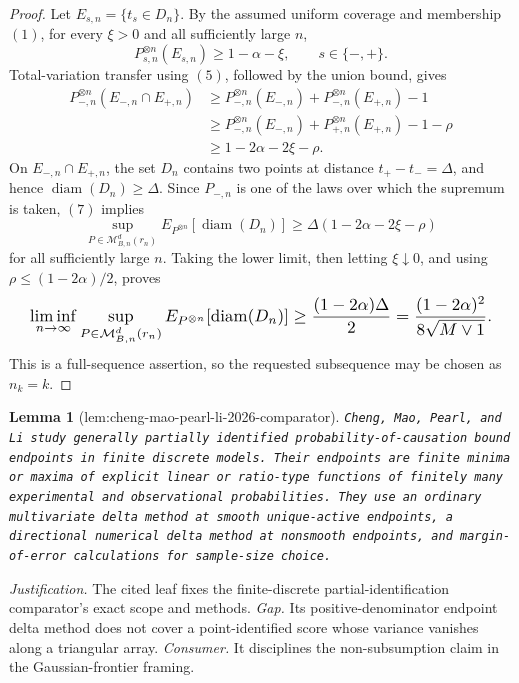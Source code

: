 \documentclass{article}
\newtheorem{lemma}{Lemma}
\begin{document}
\begin{proof}
Let \(E_{s,n}=\{t_s\in D_n\}\). By the assumed uniform coverage and membership \((1)\), for every \(\xi>0\) and all sufficiently large \(n\),
\[P_{s,n}^{\otimes n}(E_{s,n})\ge1-\alpha-\xi,\qquad s\in\{-,+\}.\tag{6}\]
Total-variation transfer using \((5)\), followed by the union bound, gives
\[\begin{aligned}
P_{-,n}^{\otimes n}(E_{-,n}\cap E_{+,n})
&\ge P_{-,n}^{\otimes n}(E_{-,n})+P_{-,n}^{\otimes n}(E_{+,n})-1\\
&\ge P_{-,n}^{\otimes n}(E_{-,n})+P_{+,n}^{\otimes n}(E_{+,n})-1-\rho\\
&\ge1-2\alpha-2\xi-\rho.
\end{aligned}\tag{7}\]
On \(E_{-,n}\cap E_{+,n}\), the set \(D_n\) contains two points at distance \(t_+-t_-=\Delta\), and hence \(\operatorname{diam}(D_n)\ge\Delta\). Since \(P_{-,n}\) is one of the laws over which the supremum is taken, \((7)\) implies
\[\sup_{P\in\mathcal M_{B,n}^d(r_n)}E_{P^{\otimes n}}[\operatorname{diam}(D_n)]\ge\Delta(1-2\alpha-2\xi-\rho)\]
for all sufficiently large \(n\). Taking the lower limit, then letting \(\xi\downarrow0\), and using \(\rho\le(1-2\alpha)/2\), proves
\[
\makebox[\linewidth][c]{\resizebox{0.98\linewidth}{!}{\par\noindent \makebox[\linewidth][c]{\resizebox{0.98\linewidth}{!}{\(\displaystyle \displaystyle \liminf_{n\to\infty}\sup_{P\in\mathcal M_{B,n}^d(r_n)}E_{P^{\otimes n}}[\operatorname{diam}(D_n)]\ge\frac{(1-2\alpha)\Delta}{2}=\frac{(1-2\alpha)^2}{8\sqrt{M\vee1}}.\)}}\par\noindent}}
\]
This is a full-sequence assertion, so the requested subsequence may be chosen as \(n_k=k\).
\end{proof}

\begin{lemma}[lem:cheng-mao-pearl-li-2026-comparator]\label{lem:cheng-mao-pearl-li-2026-comparator}
\texttt{Cheng,\allowbreak{} Mao,\allowbreak{} Pearl,\allowbreak{} and Li study generally partially identified probability-\allowbreak{}of-\allowbreak{}causation bound endpoints in finite discrete models. Their endpoints are finite minima or maxima of explicit linear or ratio-\allowbreak{}type functions of finitely many experimental and observational probabilities. They use an ordinary multivariate delta method at smooth unique-\allowbreak{}active endpoints,\allowbreak{} a directional numerical delta method at nonsmooth endpoints,\allowbreak{} and margin-\allowbreak{}of-\allowbreak{}error calculations for sample-\allowbreak{}size choice.}
\end{lemma}
\par\smallskip\noindent \textit{Justification.} The cited leaf fixes the finite-discrete partial-identification comparator's exact scope and methods. \textit{Gap.} Its positive-denominator endpoint delta method does not cover a point-identified score whose variance vanishes along a triangular array. \textit{Consumer.} It disciplines the non-subsumption claim in the Gaussian-frontier framing.
\end{document}
